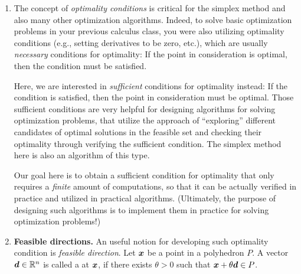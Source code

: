 \begin{enumerate}
\item The concept of \emph{optimality conditions} is critical for the simplex
method and also many other optimization algorithms. Indeed, to
solve basic optimization problems in your previous calculus class, you were
also utilizing optimality conditions (e.g., setting derivatives to be zero,
etc.), which are usually \emph{necessary} conditions for optimality: If the
point in consideration is optimal, then the condition must be satisfied.

Here, we are interested in \emph{sufficient} conditions for optimality instead:
If the condition is satisfied, then the point in consideration must be optimal.
Those sufficient conditions are very helpful for designing algorithms for
solving optimization problems, that utilize the approach of ``exploring''
different candidates of optimal solutions in the feasible set and checking
their optimality through verifying the sufficient condition. The simplex method
here is also an algorithm of this type.

Our goal here is to obtain a sufficient condition for optimality that only
requires a \emph{finite} amount of computations, so that it can be actually
verified in practice and utilized in practical algorithms. (Ultimately, the
purpose of designing such algorithms is to implement them in practice for
solving optimization problems!)

\item \textbf{Feasible directions.} An useful notion for developing such
optimality condition is \emph{feasible direction}. Let \(\bm{x}\) be a point
in a polyhedron \(P\). A vector \(\bm{d}\in\mathbb{R}^n\) is called a  at \(\bm{x}\), if there exists \(\theta>0\) such that
\(\bm{x}+\theta \bm{d}\in P\).


\end{enumerate}
